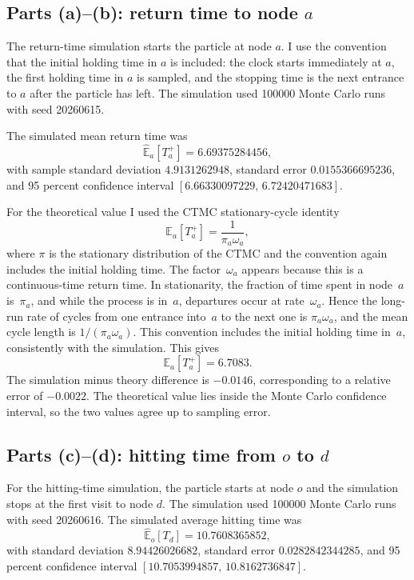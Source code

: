 \documentclass[11pt]{article}
\begin{document}
\subsection*{Parts (a)--(b): return time to node $a$}

The return-time simulation starts the particle at node $a$. I use the convention
that the initial holding time in $a$ is included: the clock starts immediately
at $a$, the first holding time in $a$ is sampled, and the stopping time is the
next entrance to $a$ after the particle has left. The simulation used 100000
Monte Carlo runs with seed 20260615.

The simulated mean return time was
\[
    \widehat{\mathbb{E}}_a[T_a^+] = 6.69375284456,
\]
with sample standard deviation $4.9131262948$, standard error
$0.0155366695236$, and 95 percent confidence interval
$[6.66330097229,\,6.72420471683]$.

For the theoretical value I used the CTMC stationary-cycle identity
\[
    \mathbb{E}_a[T_a^+] = \frac{1}{\pi_a \omega_a},
\]
where $\pi$ is the stationary distribution of the CTMC and the convention again
includes the initial holding time.
The factor~$\omega_a$ appears because this is a continuous-time return time.
In stationarity, the fraction of time spent in node~$a$ is~$\pi_a$, and while
the process is in~$a$, departures occur at rate~$\omega_a$.  Hence the
long-run rate of cycles from one entrance into~$a$ to the next one is
$\pi_a\omega_a$, and the mean cycle length is $1/(\pi_a\omega_a)$.
This convention includes the initial holding time in~$a$, consistently with
the simulation.
This gives
\[
    \mathbb{E}_a[T_a^+] = 6.7083.
\]
The simulation minus theory difference is $-0.0146$, corresponding to
a relative error of $-0.0022$. The theoretical value lies inside the
Monte Carlo confidence interval, so the two values agree up to sampling error.

\subsection*{Parts (c)--(d): hitting time from $o$ to $d$}

For the hitting-time simulation, the particle starts at node $o$ and the
simulation stops at the first visit to node $d$. The simulation used 100000
Monte Carlo runs with seed 20260616. The simulated average hitting time was
\[
    \widehat{\mathbb{E}}_o[T_d] = 10.7608365852,
\]
with standard deviation $8.94426026682$, standard error $0.0282842344285$, and
95 percent confidence interval $[10.7053994857,\,10.8162736847]$.
\end{document}
